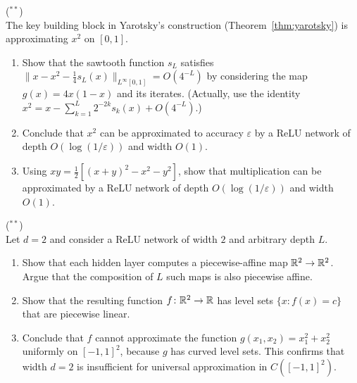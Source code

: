 \documentclass[11pt,a4paper]{article}
\begin{document}
\begin{exercise}
\textnormal{(\({}^{**}\))} \\
The key building block in Yarotsky's construction
(Theorem~\ref{thm:yarotsky}) is approximating $x^2$ on $[0,1]$.
\begin{enumerate}[label=(\alph*)]
  \item Show that the sawtooth function $s_L$ satisfies
    $\|x - x^2 - \frac{1}{4} s_L(x)\|_{L^\infty[0,1]} = O(4^{-L})$
    by considering the map $g(x) = 4x(1-x)$ and its iterates.
    (Actually, use the identity $x^2 = x - \sum_{k=1}^L
    2^{-2k} s_k(x) + O(4^{-L})$.)
  \item Conclude that $x^2$ can be approximated to accuracy
    $\varepsilon$ by a ReLU network of depth $O(\log(1/\varepsilon))$
    and width $O(1)$.
  \item Using $xy = \frac{1}{2}[(x+y)^2 - x^2 - y^2]$, show that
    multiplication can be approximated by a ReLU network of depth
    $O(\log(1/\varepsilon))$ and width $O(1)$.
\end{enumerate}
\end{exercise}

\begin{exercise}
\textnormal{(\({}^{**}\))} \\
Let $d = 2$ and consider a ReLU network of width $2$ and arbitrary
depth $L$.
\begin{enumerate}[label=(\alph*)]
  \item Show that each hidden layer computes a piecewise-affine map
    $\mathbb{R}^2 \to \mathbb{R}^2$.  Argue that the composition of $L$ such maps is
    also piecewise affine.
  \item Show that the resulting function $f \colon \mathbb{R}^2 \to \mathbb{R}$ has
    level sets $\{x : f(x) = c\}$ that are piecewise linear.
  \item Conclude that $f$ cannot approximate the function
    $g(x_1, x_2) = x_1^2 + x_2^2$ uniformly on $[-1,1]^2$, because
    $g$ has curved level sets.  This confirms that width $d = 2$ is
    insufficient for universal approximation in $C([-1,1]^2)$.
\end{enumerate}
\end{exercise}
\end{document}
